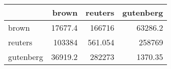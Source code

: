 \begin{tabular}{lrrr}
\hline
           &    brown &    reuters &   gutenberg \\
\hline
 brown     &  17677.4 & 166716     &    63286.2  \\
 reuters   & 103384   &    561.054 &   258769    \\
 gutenberg &  36919.2 & 282273     &     1370.35 \\
\hline
\end{tabular}